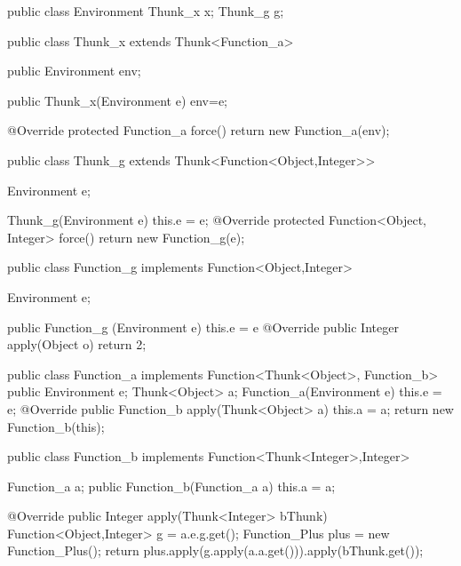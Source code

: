 \documentclass[12pt,a4paper,twoside]{article}
\begin{document}
\begin{JavaLst}
public class Environment {
    Thunk_x x;
    Thunk_g g;
}

public class Thunk_x extends Thunk<Function_a>{
    public Environment env;

    public Thunk_x(Environment e) {env=e;}

    @Override
    protected Function_a force() {
        return new Function_a(env);
    }
}

public class Thunk_g extends Thunk<Function<Object,Integer>> {
    Environment e;

    Thunk_g(Environment e) {
        this.e = e;
    }
    @Override
    protected Function<Object, Integer> force() {
        return new Function_g(e);
    }
}

public class Function_g implements Function<Object,Integer> {
    Environment e;

    public Function_g (Environment e) {
      this.e = e
    }
    @Override
    public Integer apply(Object o) {
        return 2;
    }
}

public class Function_a implements Function<Thunk<Object>, Function_b> {
    public Environment e;
    Thunk<Object>  a;
    Function_a(Environment e) {
        this.e = e;
    }
    @Override
    public Function_b apply(Thunk<Object> a) {
        this.a = a;
        return new Function_b(this);
    }
}

public class Function_b implements Function<Thunk<Integer>,Integer>{
    Function_a a;
    public Function_b(Function_a a) {
        this.a = a;
    }

    @Override
    public Integer apply(Thunk<Integer> bThunk) {
        Function<Object,Integer> g = a.e.g.get();
        Function_Plus plus = new Function_Plus();
        return plus.apply(g.apply(a.a.get())).apply(bThunk.get());
    }
}
\end{JavaLst}

\end{document}
